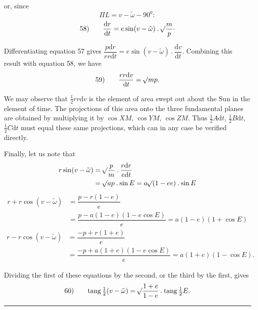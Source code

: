 or, since
\[
\Pi L=v-\tilde\omega-90^{0}:
\]
\[
\begin{array}{rl}58)\quad&\dfrac{\mathrm{d}r}{\mathrm{d}t}=e\sin(v-\tilde\omega)\mathbin{.}\mathord{{}^{}\!\surd}\dfrac{m}{p}\mathpunct{\cdot}\end{array}
\]
\par Differentiating equation 57 gives \(\dfrac{p\mathrm{d}r}{rr\mathrm{d}t}=e\sin(v-\tilde\omega)\mathbin{.}\dfrac{\mathrm{d}v}{\mathrm{d}t}\). Combining this result with equation 58, we have
\[
\begin{array}{rl}59)\quad&\dfrac{rr\mathrm{d}v}{\mathrm{d}t}=\mathord{{}^{}\!\surd}mp.\end{array}
\]
\par We may observe that \(\tfrac12rr\mathrm{d}v\) is the element of area swept out about the Sun in the element of time. The projections of this area onto the three fundamental planes are obtained by multiplying it by \(\cos XM\), \(\cos YM\), \(\cos ZM\). Thus \(\tfrac12A\mathrm{d}t\), \(\tfrac12B\mathrm{d}t\), \(\tfrac12C\mathrm{d}t\) must equal these same projections, which can in any case be verified directly.
\par Finally, let us note that
\[
\begin{aligned}
r\sin(v-\tilde\omega)&=\mathord{{}^{}\!\surd}\dfrac{p}{m}\mathbin{.}\dfrac{r\mathrm{d}r}{e\mathrm{d}t}\\
&=\mathord{{}^{}\!\surd}ap\mathbin{.}\sin E=a\mathord{{}^{}\!\surd}(1-ee)\mathbin{.}\sin E
\end{aligned}
\]
\[
\begin{aligned}
r+r\cos(v-\tilde\omega)&=\dfrac{p-r(1-e)}{e}\\
&=\dfrac{p-a(1-e)(1-e\cos E)}{e}=a(1-e)(1+\cos E)
\end{aligned}
\]
\[
\begin{aligned}
r-r\cos(v-\tilde\omega)&=\dfrac{-p+r(1+e)}{e}\\
&=\dfrac{-p+a(1+e)(1-e\cos E)}{e}=a(1+e)(1-\cos E).
\end{aligned}
\]
\par Dividing the first of these equations by the second, or the third by the first, gives
\[
\begin{array}{rl}60)\quad&\operatorname{tang}\tfrac12(v-\tilde\omega)=\mathord{{}^{}\!\surd}\dfrac{1+e}{1-e}\mathbin{.}\operatorname{tang}\tfrac12E.\end{array}
\]
\par\medskip\begin{center}\rule{.18\textwidth}{.3pt}\end{center}
